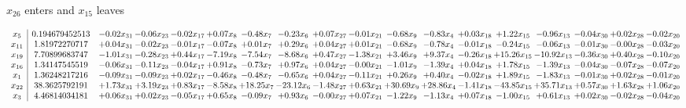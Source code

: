\documentclass[9pt]{article}
\begin{document}
 $ x_{26} $ enters and $ x_{15} $ leaves 

 \[\begin{array}{c| c c@{\hskip 2pt} c@{\hskip 2pt} c@{\hskip 2pt} c@{\hskip 2pt} c@{\hskip 2pt} c@{\hskip 2pt} c@{\hskip 2pt} c@{\hskip 2pt} c@{\hskip 2pt} c@{\hskip 2pt} c@{\hskip 2pt} c@{\hskip 2pt} c@{\hskip 2pt} c@{\hskip 2pt} c@{\hskip 2pt} c@{\hskip 2pt} }
 x_{5}   &  0.194679452513 & -0.02 x_{31} & -0.06 x_{23} & -0.02 x_{17} & +  0.07 x_{8} & -0.48 x_{7} & -0.23 x_{6} & +  0.07 x_{27} & -0.01 x_{21} & -0.68 x_{9} & -0.83 x_{4} & +  0.03 x_{18} & +  1.22 x_{15} & -0.96 x_{13} & -0.04 x_{30} & +  0.02 x_{28} & -0.02 x_{20}\\
 x_{11}   &  1.81972270717 & +  0.04 x_{31} & -0.02 x_{23} & -0.01 x_{17} & -0.07 x_{8} & +  0.01 x_{7} & +  0.29 x_{6} & +  0.04 x_{27} & +  0.01 x_{21} & -0.68 x_{9} & -0.78 x_{4} & -0.01 x_{18} & -0.24 x_{15} & -0.06 x_{13} & -0.01 x_{30} & -0.00 x_{28} & -0.03 x_{20}\\
 x_{19}   &  7.70899683747 & -1.01 x_{31} & -0.28 x_{23} & +  0.44 x_{17} & -7.19 x_{8} & -7.54 x_{7} & -8.68 x_{6} & +  0.47 x_{27} & -1.38 x_{21} & +  3.46 x_{9} & +  9.37 x_{4} & -0.26 x_{18} & + 15.26 x_{15} & -10.92 x_{13} & -0.36 x_{30} & +  0.40 x_{28} & -0.10 x_{20}\\
 x_{16}   &  1.34147545519 & -0.06 x_{31} & -0.11 x_{23} & -0.04 x_{17} & +  0.91 x_{8} & -0.73 x_{7} & +  0.97 x_{6} & +  0.04 x_{27} & -0.00 x_{21} & -1.01 x_{9} & -1.39 x_{4} & +  0.04 x_{18} & +  1.78 x_{15} & -1.39 x_{13} & -0.04 x_{30} & -0.07 x_{28} & -0.07 x_{20}\\
 x_{1}   &  1.36248217216 & -0.09 x_{31} & -0.09 x_{23} & +  0.02 x_{17} & -0.46 x_{8} & -0.48 x_{7} & -0.65 x_{6} & +  0.04 x_{27} & -0.11 x_{21} & +  0.26 x_{9} & +  0.40 x_{4} & -0.02 x_{18} & +  1.89 x_{15} & -1.83 x_{13} & -0.01 x_{30} & +  0.02 x_{28} & -0.01 x_{20}\\
 x_{22}   &  38.3625792191 & +  1.73 x_{31} & +  3.19 x_{23} & +  0.83 x_{17} & -8.58 x_{8} & + 18.25 x_{7} & -23.12 x_{6} & -1.48 x_{27} & +  0.63 x_{21} & + 30.69 x_{9} & + 28.86 x_{4} & -1.41 x_{18} & -43.85 x_{15} & + 35.71 x_{13} & +  0.57 x_{30} & +  1.63 x_{28} & +  1.06 x_{20}\\
 x_{3}   &  4.46814034181 & +  0.06 x_{31} & +  0.02 x_{23} & -0.05 x_{17} & +  0.65 x_{8} & -0.09 x_{7} & +  0.93 x_{6} & -0.00 x_{27} & +  0.07 x_{21} & -1.22 x_{9} & -1.13 x_{4} & +  0.07 x_{18} & -1.00 x_{15} & +  0.61 x_{13} & +  0.02 x_{30} & -0.02 x_{28} & -0.04 x_{20}\\

\end{array}\]
\end{document}
